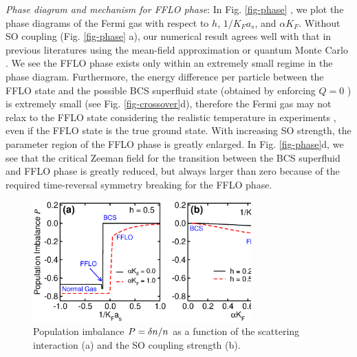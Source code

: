 \documentclass[prl,showpacs,twocolumn]{revtex4}
\begin{document}
\textit{Phase diagram and mechanism for FFLO phase}: In Fig. \ref{fig-phase}%
, we plot the phase diagrams of the Fermi gas with respect to $h$, $%
1/K_{F}a_{s}$, and $\alpha K_{F}$. Without SO coupling (Fig. \ref{fig-phase}%
a), our numerical result agrees well with that in previous literatures using
the mean-field approximation \cite{Hu} or quantum Monte Carlo \cite{Carlson}%
. We see the FFLO phase exists only within an extremely small regime in the
phase diagram. Furthermore, the energy difference per particle between the
FFLO state and the possible BCS superfluid state (obtained by enforcing $Q=0$%
) is extremely small (see Fig. \ref{fig-crossover}d), therefore the Fermi
gas may not relax to the FFLO state considering the realistic temperature in
experiments \cite{Zwierlein05}, even if the FFLO state is the true ground
state. With increasing SO strength, the parameter region of the FFLO phase
is greatly enlarged. In Fig. \ref{fig-phase}d, we see that the critical
Zeeman field for the transition between the BCS superfluid and FFLO phase is
greatly reduced, but always larger than zero because of the required
time-reversal symmetry breaking for the FFLO phase.

\begin{figure}[tbp]
\centering
\includegraphics[width=3.3in]{sigmax.eps}
\caption{Population imbalance $P=\protect\delta n/n$ as a function of the
scattering interaction (a) and the SO coupling strength (b).}
\label{fig-sigmax}
\end{figure}
\end{document}
